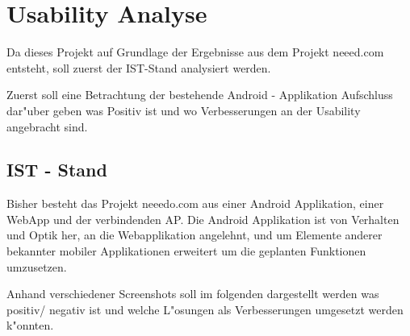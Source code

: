 \section{Usability Analyse}

Da dieses Projekt auf Grundlage der Ergebnisse aus dem Projekt neeed.com entsteht, soll zuerst der IST-Stand analysiert werden.

Zuerst soll eine Betrachtung der bestehende  Android - Applikation  Aufschluss dar"uber geben was Positiv ist und wo Verbesserungen an der Usability angebracht sind. 

\subsection{IST - Stand}

Bisher besteht das Projekt neeedo.com aus einer Android Applikation, einer WebApp und der verbindenden AP.  
Die Android Applikation ist von Verhalten und Optik her, an die Webapplikation angelehnt, und um Elemente anderer bekannter mobiler Applikationen erweitert um die geplanten Funktionen umzusetzen. 

Anhand verschiedener Screenshots soll im folgenden dargestellt werden was positiv/ negativ ist  und welche L"osungen als Verbesserungen umgesetzt werden k"onnten. 

